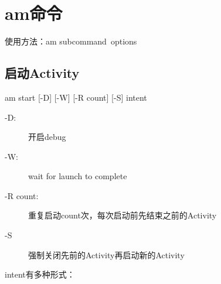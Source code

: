 \section[am - Application Manager]{am命令}
使用方法：am \lt subcommand\gt\ \lt options\gt

\subsection[启动Activity]{启动Activity}
am start [-D] [-W] [-R \lt count\gt] [-S] \lt intent\gt

\begin{description}
\item[-D:] 开启debug
\item[-W:] wait for launch to complete
\item[-R \lt count\gt:] 重复启动count次，每次启动前先结束之前的Activity
\item[-S] 强制关闭先前的Activity再启动新的Activity
\end{description}

\lt intent\gt 有多种形式：

